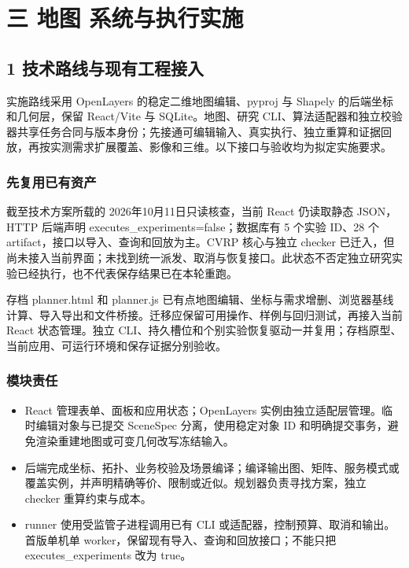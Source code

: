 \documentclass[11pt,a4paper]{article}
\newcommand{\bodytext}[1]{#1\par}
\begin{document}
\section{三 地图 系统与执行实施}
\subsection{1  技术路线与现有工程接入}
\bodytext{实施路线采用 OpenLayers 的稳定二维地图编辑、pyproj 与 Shapely 的后端坐标和几何层，保留 React/\allowbreak{}Vite 与 SQLite。地图、研究 CLI、算法适配器和独立校验器共享任务合同与版本身份；先接通可编辑输入、真实执行、独立重算和证据回放，再按实测需求扩展覆盖、影像和三维。以下接口与验收均为拟定实施要求。}
\subsubsection{先复用已有资产}
\bodytext{截至技术方案所载的 2026年10月11日只读核查，当前 React 仍读取静态 JSON，HTTP 后端声明 executes\_\allowbreak{}experiments=false；数据库有 5 个实验 ID、28 个 artifact，接口以导入、查询和回放为主。CVRP 核心与独立 checker 已迁入，但尚未接入当前界面；未找到统一派发、取消与恢复接口。此状态不否定独立研究实验已经执行，也不代表保存结果已在本轮重跑。}
\bodytext{存档 planner.html 和 planner.js 已有点地图编辑、坐标与需求增删、浏览器基线计算、导入导出和文件桥接。迁移应保留可用操作、样例与回归测试，再接入当前 React 状态管理。独立 CLI、持久槽位和个别实验恢复驱动一并复用；存档原型、当前应用、可运行环境和保存证据分别验收。}
\subsubsection{模块责任}
\begin{itemize}
\item React 管理表单、面板和应用状态；OpenLayers 实例由独立适配层管理。临时编辑对象与已提交 SceneSpec 分离，使用稳定对象 ID 和明确提交事务，避免渲染重建地图或可变几何改写冻结输入。
\item 后端完成坐标、拓扑、业务校验及场景编译；编译输出图、矩阵、服务模式或覆盖实例，并声明精确等价、限制或近似。规划器负责寻找方案，独立 checker 重算约束与成本。
\item runner 使用受监管子进程调用已有 CLI 或适配器，控制预算、取消和输出。首版单机单 worker，保留现有导入、查询和回放接口；不能只把 executes\_\allowbreak{}experiments 改为 true。
\end{itemize}
\end{document}
